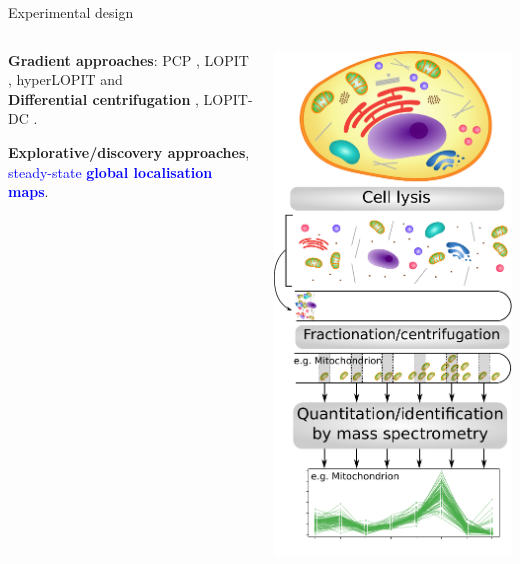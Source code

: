 \begin{frame}[t]{Experimental design}
  \begin{columns}
    \begin{column}{0.5\textwidth}
      
      \textbf{Gradient approaches}: PCP \citep{Dunkley:2006}, LOPIT
      \citep{Foster2006}, hyperLOPIT
      \citep{Christoforou:2016,Mulvey:2017} and \\

      \textbf{Differential centrifugation} \cite{Itzhak:2016},
      LOPIT-DC \citep{Geladaki:2018}.
     
      \bigskip
      
      \textbf{Explorative/discovery approaches},
      \textcolor{Blue}{steady-state \textbf{global localisation
          maps}}.
      
    \end{column}
    \begin{column}{0.5\textwidth}
      \includegraphics[width=.7\linewidth]{figs/workflow_primary.pdf}
    \end{column}    
  \end{columns}
\end{frame}


